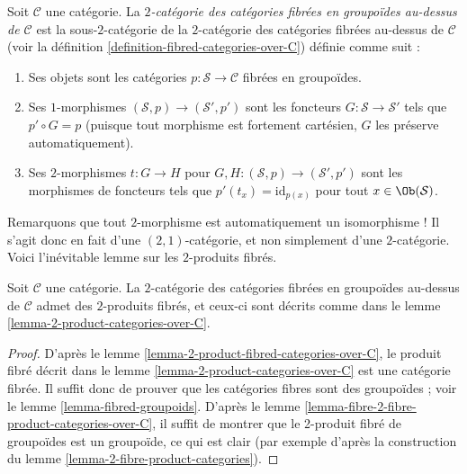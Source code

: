 \begin{definition}
\label{definition-categories-fibred-in-groupoids-over-C}
Soit $\mathcal{C}$ une catégorie.
La {\it $2$-catégorie des catégories fibrées en groupoïdes au-dessus de $\mathcal{C}$}
est la sous-$2$-catégorie de la $2$-catégorie des catégories fibrées
au-dessus de $\mathcal{C}$ (voir la définition \ref{definition-fibred-categories-over-C})
définie comme suit :
\begin{enumerate}
\item Ses objets sont les catégories
$p : \mathcal{S} \to \mathcal{C}$ fibrées en groupoïdes.
\item Ses $1$-morphismes $(\mathcal{S}, p) \to (\mathcal{S}', p')$
sont les foncteurs $G : \mathcal{S} \to \mathcal{S}'$ tels que
$p' \circ G = p$ (puisque tout morphisme est fortement cartésien,
$G$ les préserve automatiquement).
\item Ses $2$-morphismes $t : G \to H$ pour
$G, H : (\mathcal{S}, p) \to (\mathcal{S}', p')$
sont les morphismes de foncteurs
tels que $p'(t_x) = \text{id}_{p(x)}$
pour tout $x \in \Ob(\mathcal{S})$.
\end{enumerate}
\end{definition}

\noindent
Remarquons que tout $2$-morphisme est automatiquement un isomorphisme !
Il s'agit donc en fait d'une $(2, 1)$-catégorie, et non simplement d'une
$2$-catégorie. Voici l'inévitable lemme sur les $2$-produits fibrés.

\begin{lemma}
\label{lemma-2-product-fibred-categories}
Soit $\mathcal{C}$ une catégorie.
La $2$-catégorie des catégories fibrées en groupoïdes
au-dessus de $\mathcal{C}$ admet des $2$-produits fibrés, et ceux-ci sont décrits comme dans le
lemme \ref{lemma-2-product-categories-over-C}.
\end{lemma}

\begin{proof}
D'après le lemme \ref{lemma-2-product-fibred-categories-over-C},
le produit fibré décrit dans le
lemme \ref{lemma-2-product-categories-over-C} est une catégorie fibrée.
Il suffit donc de prouver que les catégories fibres sont des
groupoïdes ; voir le lemme \ref{lemma-fibred-groupoids}.
D'après le lemme \ref{lemma-fibre-2-fibre-product-categories-over-C},
il suffit de montrer que le 2-produit fibré de groupoïdes
est un groupoïde, ce qui est clair (par exemple d'après la construction du
lemme \ref{lemma-2-fibre-product-categories}).
\end{proof}

